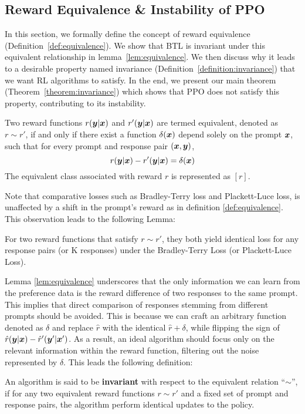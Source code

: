 \documentclass{article} %
\begin{document}
\subsection{Reward Equivalence \& Instability of PPO}\label{sec:instability}
In this section, we formally define the concept of reward equivalence (Definition~\ref{def:equivalence}). We show that BTL is invariant under this equivalent relationship in lemma~\ref{lem:equivalence}. We then discuss why it leads to a desirable property named invariance (Definition~\ref{definition:invariance}) that we want RL algorithms to satisfy. In the end, we present our main theorem (Theorem~\ref{theorem:invariance}) which shows that PPO does not satisfy this property, contributing to its instability.
\begin{definition}\label{def:equivalence}
    Two reward functions $r({\bm{y}}|{\bm{x}})$ and $r'({\bm{y}}|{\bm{x}})$ are termed equivalent, denoted as $r\sim r'$, if and only if there exist a function $\delta({\bm{x}})$ depend solely on the prompt ${\bm{x}}$, such that for every prompt and response pair $({\bm{x}},{\bm{y}})$,
    $$r({\bm{y}}|{\bm{x}})-r'({\bm{y}}|{\bm{x}}) = \delta({\bm{x}})$$
    The equivalent class associated with reward $r$ is represented as $[r]$.
\end{definition}
Note that comparative losses such as Bradley-Terry loss and Plackett-Luce loss, is unaffected by a shift in the prompt's reward as in definition \ref{def:equivalence}. This observation leads to the following Lemma:
\begin{lemma}\label{lem:equivalence}
    For two reward functions that satisfy $r \sim r'$, they both yield identical loss for any response pairs (or K responses) under the Bradley-Terry Loss (or Plackett-Luce Loss).
\end{lemma}
Lemma \ref{lem:equivalence} underscores that the only information we can learn from the preference data is the reward difference of two responses to the same prompt. This implies that direct comparison of responses stemming from different prompts should be avoided. This is because we can craft an arbitrary function denoted as $\delta$ and replace $\hat{r}$ with the identical $\hat{r}+\delta$, while flipping the sign of $\hat{r}({\bm{y}}|{\bm{x}})-\hat{r}'({\bm{y}}'|{\bm{x}}')$. As a result, an ideal algorithm should focus only on the relevant information within the reward function, filtering out the noise represented by $\delta$.  
This leads the following definition:
\begin{definition}[Invariance]
    An algorithm is said to be \textbf{invariant} with respect to the equivalent relation ``$\sim$'', if for any two equivalent reward functions $r \sim r'$ and a fixed set of prompt and response pairs, the algorithm perform identical updates to the policy.\label{definition:invariance}
\end{definition}
\end{document}
